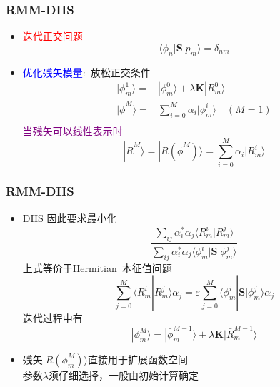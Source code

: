 \documentclass[cjk,slidestop,compress,mathserif,blue]{beamer}
\begin{document}
   \frame
   {
	   \frametitle{\textrm{RMM-DIIS}}
	   \begin{itemize}
		   \item \textcolor{red}{迭代正交问题}
			   \begin{displaymath}
				   \langle\phi_n|\mathbf{S}|p_m\rangle=\delta_{nm}
			   \end{displaymath}
		   \item \textcolor{blue}{优化残矢模量}:~放松正交条件
			   \begin{displaymath}
				   \begin{aligned}
					   |\phi_m^1\rangle=&|\phi_m^0\rangle+\lambda\mathbf{K}|R_m^0\rangle\\
					   |\bar\phi^M\rangle=&\sum_{i=0}^M\alpha_i|\phi_m^i\rangle\quad(M=1)\\
				   \end{aligned}
			   \end{displaymath}
			   \textcolor{purple}{当残矢可以线性表示时}
			   \begin{displaymath}
				   |\bar{R}^M\rangle=|R(\bar\phi^M)\rangle=\sum_{i=0}^M\alpha_i|R_m^i\rangle
			   \end{displaymath}
	   \end{itemize}
   }

   \frame
   {
	   \frametitle{\textrm{RMM-DIIS}}
	   \begin{itemize}
		   \item {DIIS}
			   因此要求最小化
			   \begin{displaymath}
				   \dfrac{\sum_{ij}\alpha_i^{\ast}\alpha_j\langle R_m^i|R_m^j\rangle}{\sum_{ij}\alpha_i^{\ast}\alpha_j\langle\phi_m^i|\mathbf{S}|\phi_m^j\rangle}
			   \end{displaymath}
			   上式等价于\textrm{Hermitian~}本征值问题
			   \begin{displaymath}
				   \sum_{j=0}^M\langle R_m^i|R_m^j\rangle\alpha_j=\varepsilon\sum_{j=0}^M\langle\phi_m^i|\mathbf{S}|\phi_m^j\rangle\alpha_j
			   \end{displaymath}
			   迭代过程中有
			   \begin{displaymath}
				   |\phi_m^M\rangle=|\bar\phi_m^{M-1}\rangle+\lambda\mathbf{K}|\bar{R}_m^{M-1}\rangle
			   \end{displaymath}
	   \item 残矢$|R(\phi_m^M)\rangle$直接用于扩展函数空间\\
			   参数$\lambda$须仔细选择，一般由初始计算确定
	   \end{itemize}
   }
\end{document}
